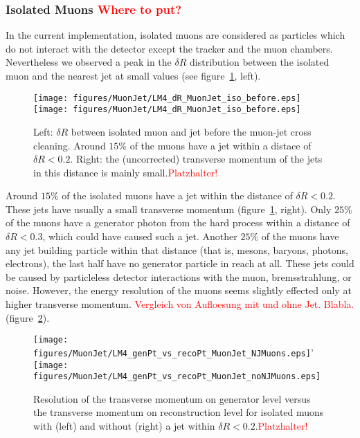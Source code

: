 \documentclass{cmspaper}
\begin{document}
\subsubsection{Isolated Muons \textcolor{red}{Where to put?}}

In the current implementation, isolated muons are considered as particles which do not interact with the detector except the tracker and the muon chambers. Nevertheless we observed a peak in the \(\delta R\) distribution between the isolated muon and the nearest jet at small values (see figure~\ref{fig:dR_MuonJet_iso}, left).

\begin{figure}[hb]
\begin{center}
    \texttt{[image: figures/MuonJet/LM4\_dR\_MuonJet\_iso\_before.eps]}
    \texttt{[image: figures/MuonJet/LM4\_dR\_MuonJet\_iso\_before.eps]}
    \caption{Left: \(\delta R\) between isolated muon and jet before the muon-jet cross cleaning. Around \(15\%\) of the muons have a jet within a distace of \(\delta R < 0.2\). Right: the (uncorrected) transverse momentum of the jets in this distance is mainly small.\textcolor{red}{Platzhalter!}}
\label{fig:dR_MuonJet_iso}
\end{center}
\end{figure}

Around \(15\%\) of the isolated muons have a jet within the distance of \(\delta R < 0.2\). These jets have usually a small transverse momentum (figure~\ref{fig:dR_MuonJet_iso}, right). Only \(25\%\) of the muons have a generator photon from the hard process within a distance of \(\delta R < 0.3\), which could have caused such a jet. Another \(25\%\) of the muons have any jet building particle within that distance (that is, mesons, baryons, photons, electrons), the last half have no generator particle in reach at all. These jets could be caused by particleless detector interactions with the muon, bremsstrahlung, or noise. However, the energy resolution of the muons seems slightly effected only at higher transverse momentum. \textcolor{red}{Vergleich von Aufloesung mit und ohne Jet. Blabla.}(figure~\ref{fig:genPt_vs_recoPt_isoMuon}).

\begin{figure}[hb]
\begin{center}
    \texttt{[image: figures/MuonJet/LM4\_genPt\_vs\_recoPt\_MuonJet\_NJMuons.eps]}'
    \texttt{[image: figures/MuonJet/LM4\_genPt\_vs\_recoPt\_MuonJet\_noNJMuons.eps]}
    \caption{Resolution of the transverse momentum on generator level versus the transverse momentum on reconstruction level for isolated muons with (left) and without (right) a jet within \(\delta R < 0.2\).\textcolor{red}{Platzhalter!}}
\label{fig:genPt_vs_recoPt_isoMuon}
\end{center}
\end{figure}
\end{document}
